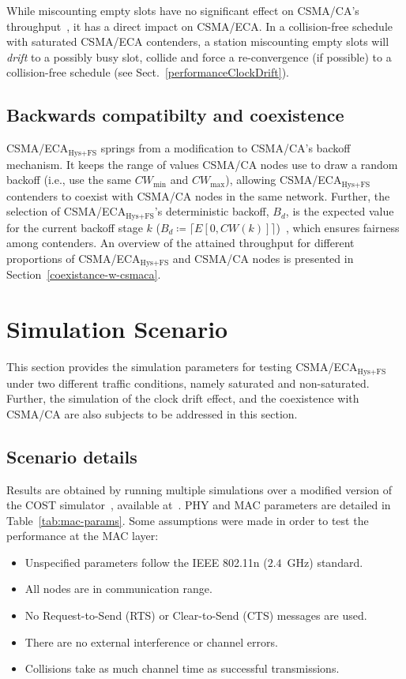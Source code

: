 \documentclass[a4paper,journal]{IEEEtran}
\begin{document}
	While miscounting empty slots have no significant effect on CSMA/CA's throughput~\cite{slotDrift}, it has a direct impact on CSMA/ECA. In a collision-free schedule with saturated CSMA/ECA contenders, a station miscounting empty slots will \emph{drift} to a possibly busy slot, collide and force a re-convergence (if possible) to a collision-free schedule (see Sect.~\ref{performanceClockDrift}).
	
	\subsection{Backwards compatibilty and coexistence}
	CSMA/ECA$_{\text{Hys+FS}}$ springs from a modification to CSMA/CA's backoff mechanism. It keeps the range of values CSMA/CA nodes use to draw a random backoff (i.e., use the same $CW_{\min}$ and $CW_{\max}$), allowing CSMA/ECA$_{\text{Hys+FS}}$ contenders to coexist with CSMA/CA nodes in the same network. Further, the selection of CSMA/ECA$_{\text{Hys+FS}}$'s deterministic backoff, $B_d$, is the expected value for the current backoff stage $k$ ($B_d\coloneqq\lceil{E[0,CW(k)]}\rceil$)~\cite{research2standards}, which ensures fairness among contenders. An overview of the attained throughput for different proportions of CSMA/ECA$_{\text{Hys+FS}}$ and CSMA/CA nodes is presented in Section~\ref{coexistance-w-csmaca}.
	
\section{Simulation Scenario}\label{simulations}
This section provides the simulation parameters for testing CSMA/ECA$_{\text{Hys+FS}}$ under two different traffic conditions, namely saturated and non-saturated. Further, the simulation of the clock drift effect, and the coexistence with CSMA/CA are also subjects to be addressed in this section.

	\subsection{Scenario details}
	Results are obtained by running multiple simulations over a modified version of the COST simulator~\cite{COST}, available at~\cite{sim:parameters}. PHY and MAC parameters are detailed in Table~\ref{tab:mac-params}. Some assumptions were made in order to test the performance at the MAC layer:
	
	\begin{itemize}
		\item Unspecified parameters follow the IEEE 802.11n ($2.4$~GHz) standard.
		\item All nodes are in communication range.
		\item No Request-to-Send (RTS) or Clear-to-Send (CTS) messages are used.
		\item There are no external interference or channel errors.
		\item Collisions take as much channel time as successful transmissions.
	\end{itemize}
	
\end{document}
